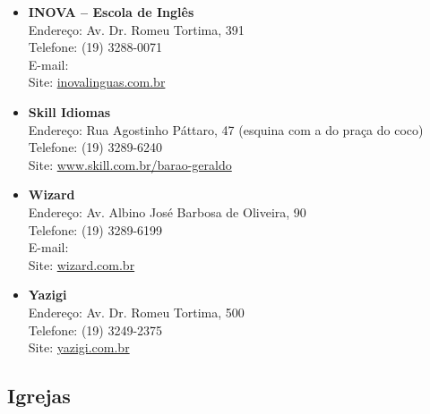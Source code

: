 \begin{itemize}
    \item   \textbf{INOVA -- Escola de Inglês}
        \\Endereço: Av. Dr. Romeu Tortima, 391
        \\Telefone: (19) 3288-0071
        \\E-mail: 
        \\Site: \url{inovalinguas.com.br}

    \item   \textbf{Skill Idiomas}
        \\Endereço: Rua Agostinho Páttaro, 47 (esquina com a do praça do coco)
        \\Telefone: (19) 3289-6240
        \\Site: \url{www.skill.com.br/barao-geraldo}

    \item   \textbf{Wizard}
        \\Endereço: Av. Albino José Barbosa de Oliveira, 90
        \\Telefone: (19) 3289-6199
        \\E-mail: 
        \\Site: \url{wizard.com.br}

    \item   \textbf{Yazigi}
        \\Endereço: Av. Dr. Romeu Tortima, 500
        \\Telefone: (19) 3249-2375
        \\Site: \url{yazigi.com.br}
\end{itemize}

\subsection{Igrejas}

